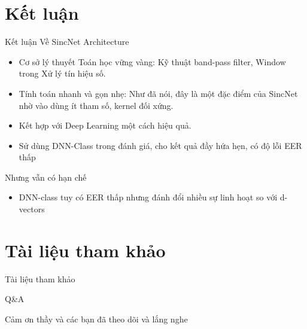 \documentclass[notheorems, aspectratio=54]{beamer}
\begin{document}
\section{Kết luận}
\begin{frame}{Kết luận}
	Về SincNet Architecture
	\begin{itemize}
		\item Cơ sở lý thuyết Toán học vững vàng: Kỹ thuật band-pass filter, Window trong Xử lý tín hiệu số.
		\item Tính toán nhanh và gọn nhẹ: Như đã nói, đây là một đặc điểm của SincNet nhờ vào dùng ít tham số, kernel đối xứng.
		\item Kết hợp với Deep Learning một cách hiệu quả.
		\item Sử dùng DNN-Class trong đánh giá, cho kết quả đầy hứa hẹn, có độ lỗi EER thấp
	\end{itemize}
	Nhưng vẫn có hạn chế
	\begin{itemize}
		\item DNN-class tuy có EER thấp nhưng đánh đổi nhiều sự linh hoạt so với d-vectors
	\end{itemize}
\end{frame}

\section{Tài liệu tham khảo}
\begin{frame}{Tài liệu tham khảo}
	\nocite{*}
	\newpage\cleardoublepage
	
\end{frame}


\begin{frame}{Q\&A}
	\begin{center}
		\Huge Cảm ơn thầy và các bạn đã theo dõi và lắng nghe
	\end{center}
\end{frame}
\end{document}
